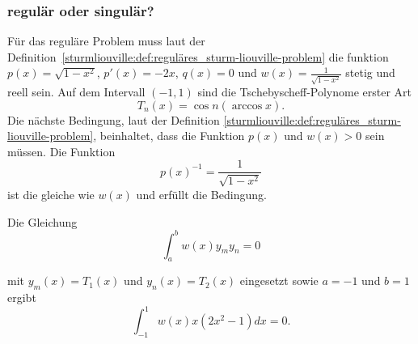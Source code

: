 \subsubsection*{regulär oder singulär?}
Für das reguläre Problem muss laut der
Definition~\ref{sturmliouville:def:reguläres_sturm-liouville-problem} die funktion
$p(x) = \sqrt{1-x^2}$, $p'(x) = -2x$, $q(x) = 0$ und
$w(x) = \frac{1}{\sqrt{1-x^2}}$ stetig und reell sein.
Auf dem Intervall $(-1,1)$ sind die Tschebyscheff-Polynome erster Art
\begin{equation}
	T_n(x)
	=
	\cos n (\arccos x).
\end{equation}
Die nächste Bedingung, laut der Definition \ref{sturmliouville:def:reguläres_sturm-liouville-problem}, beinhaltet, dass die Funktion $p(x)$ und $w(x)>0$ sein
müssen.
Die Funktion
\begin{equation*}
	p(x)^{-1} = \frac{1}{\sqrt{1-x^2}}
\end{equation*}
ist die gleiche wie $w(x)$ und erfüllt die Bedingung.



\begin{beispiel}
	Die Gleichung 
	\[
		\int_{a}^{b} w(x) y_m y_n = 0
	\]
	
	mit
	$y_m(x) = T_1(x)$ und $y_n(x) = T_2(x)$ eingesetzt sowie $a=-1$ und $b = 1$
	ergibt
	\[
	\int_{-1}^{1} w(x) x (2x^2-1) dx = 0.
	\]
\end{beispiel}
